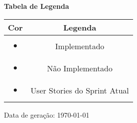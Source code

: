 \begin{landscape}
		\textbf{Tabela de Legenda} \\
		\begin{tabular}{|c|c|}
		\hline 
		{\bf Cor} & {\bf Legenda} \\
		\hline \textcolor{cImplementado}{\begin{huge} $\bullet$ \end{huge}} & Implementado \\
		\hline \textcolor{cNaoImplementado}{\begin{huge} $\bullet$ \end{huge}} & Não Implementado \\
		\hline \textcolor{cUserSprint}{\begin{huge} $\bullet$ \end{huge}} & User Stories do Sprint Atual \\
		\hline
		\end{tabular}

		Data de geração: \today
		

\end{landscape}
